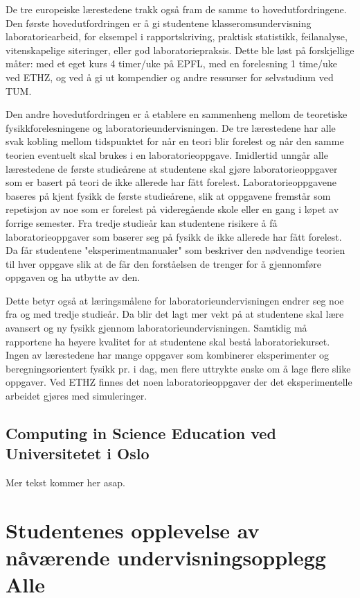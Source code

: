 \documentclass{article}
\begin{document}
De tre europeiske lærestedene trakk også fram de samme to hovedutfordringene. Den første hovedutfordringen er å gi studentene klasseromsundervisning laboratoriearbeid, for eksempel i rapportskriving, praktisk statistikk, feilanalyse, vitenskapelige siteringer, eller god laboratoriepraksis. Dette ble løst på forskjellige måter: med et eget kurs 4 timer/uke på EPFL, med en forelesning 1 time/uke ved ETHZ, og ved å gi ut kompendier og andre ressurser for selvstudium ved TUM.

Den andre hovedutfordringen er å etablere en sammenheng mellom de teoretiske fysikkforelesningene og laboratorieundervisningen. De tre lærestedene har alle svak kobling mellom tidspunktet for når en teori blir forelest og når den samme teorien eventuelt skal brukes i en laboratorieoppgave. Imidlertid unngår alle lærestedene de første studieårene at studentene skal gjøre laboratorieoppgaver som er basert på teori de ikke allerede har fått forelest. Laboratorieoppgavene baseres på kjent fysikk de første studieårene, slik at oppgavene fremstår som repetisjon av noe som er forelest på videregående skole eller en gang i løpet av forrige semester. Fra tredje studieår kan studentene risikere å få laboratorieoppgaver som baserer seg på fysikk de ikke allerede har fått forelest. Da får studentene "eksperimentmanualer" som beskriver den nødvendige teorien til hver oppgave slik at de får den forståelsen de trenger for å gjennomføre oppgaven og ha utbytte av den. 

Dette betyr også at læringsmålene for laboratorieundervisningen endrer seg noe fra og med tredje studieår. Da blir det lagt mer vekt på at studentene skal lære avansert og ny fysikk gjennom laboratorieundervisningen. Samtidig må rapportene ha høyere kvalitet for at studentene skal bestå laboratoriekurset. Ingen av lærestedene har mange oppgaver som kombinerer eksperimenter og beregningsorientert fysikk pr. i dag, men flere uttrykte ønske om å lage flere slike oppgaver. Ved ETHZ finnes det noen laboratorieoppgaver der det eksperimentelle arbeidet gjøres med simuleringer.

\subsection{Computing in Science Education ved Universitetet i Oslo} 
Mer tekst kommer her asap.

\section{Studentenes opplevelse av nåværende undervisningsopplegg {\color{red}Alle}}
\end{document}
